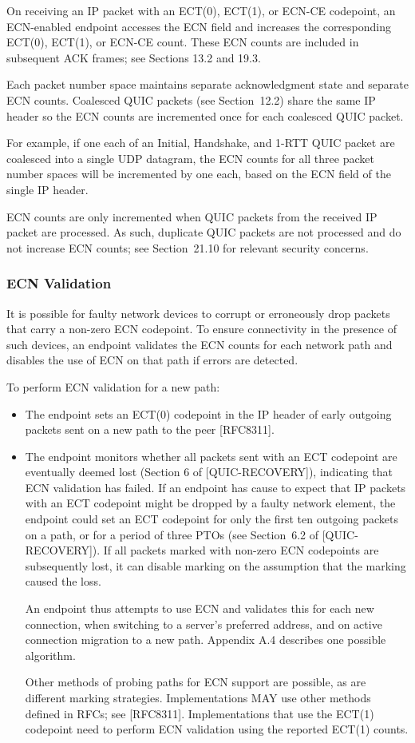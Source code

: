 \documentclass{article}
\begin{document}
On receiving an IP packet with an ECT(0), ECT(1), or ECN-CE codepoint, an ECN-enabled endpoint accesses the ECN field and increases the corresponding ECT(0), ECT(1), or ECN-CE count.  These ECN counts are included in subsequent ACK frames; see Sections 13.2 and 19.3.

Each packet number space maintains separate acknowledgment state and separate ECN counts.  Coalesced QUIC packets (see Section~12.2) share the same IP header so the ECN counts are incremented once for each coalesced QUIC packet.

For example, if one each of an Initial, Handshake, and 1-RTT QUIC packet are coalesced into a single UDP datagram, the ECN counts for all three packet number spaces will be incremented by one each, based on the ECN field of the single IP header.

ECN counts are only incremented when QUIC packets from the received IP packet are processed.  As such, duplicate QUIC packets are not processed and do not increase ECN counts; see Section~21.10 for relevant security concerns.

\subsubsection{ECN Validation}

It is possible for faulty network devices to corrupt or erroneously drop packets that carry a non-zero ECN codepoint.  To ensure connectivity in the presence of such devices, an endpoint validates the ECN counts for each network path and disables the use of ECN on that path if errors are detected.

To perform ECN validation for a new path:

\begin{itemize}
\item The endpoint sets an ECT(0) codepoint in the IP header of early outgoing packets sent on a new path to the peer [RFC8311].
\item The endpoint monitors whether all packets sent with an ECT codepoint are eventually deemed lost (Section 6 of [QUIC-RECOVERY]), indicating that ECN validation has failed.
If an endpoint has cause to expect that IP packets with an ECT codepoint might be dropped by a faulty network element, the endpoint could set an ECT codepoint for only the first ten outgoing packets on a path, or for a period of three PTOs (see Section~6.2 of [QUIC-RECOVERY]).  If all packets marked with non-zero ECN codepoints are subsequently lost, it can disable marking on the assumption that the marking caused the loss.

An endpoint thus attempts to use ECN and validates this for each new connection, when switching to a server's preferred address, and on active connection migration to a new path.  Appendix A.4 describes one possible algorithm.

Other methods of probing paths for ECN support are possible, as are different marking strategies.  Implementations MAY use other methods defined in RFCs; see [RFC8311].  Implementations that use the ECT(1) codepoint need to perform ECN validation using the reported ECT(1) counts.

\end{itemize}
\end{document}
